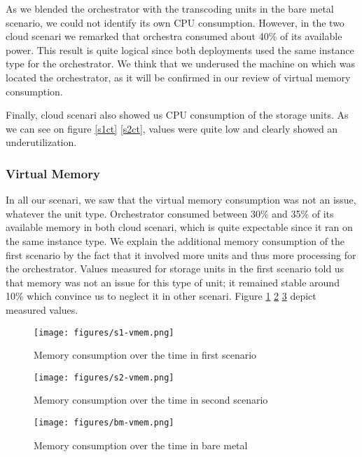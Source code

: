 \documentclass[a4paper, titlepage]{paper}
\numberwithin{figure}{section}
\numberwithin{table}{section}
\begin{document}
        As we blended the orchestrator with the transcoding units in the bare metal scenario, we could not identify its own CPU consumption. However, in the two cloud scenari we remarked that orchestra consumed about 40\% of its available power. This result is quite logical since both deployments used the same instance type for the orchestrator. We think that we underused the machine on which was located the orchestrator, as it will be confirmed in our review of virtual memory consumption.

        Finally, cloud scenari also showed us CPU consumption of the storage units. As we can see on figure \ref{s1ct} \ref{s2ct}, values were quite low and clearly showed an underutilization.

      \subsubsection{Virtual Memory}
        In all our scenari, we saw that the virtual memory consumption was not an issue, whatever the unit type. Orchestrator consumed between 30\% and 35\% of its available memory in both cloud scenari, which is quite expectable since it ran on the same instance type. We explain the additional memory consumption of the first scenario by the fact that it involved more units and thus more processing for the orchestrator. Values measured for storage units in the first scenario told us that memory was not an issue for this type of unit; it remained stable around 10\% which convince us to neglect it in other scenari. Figure \ref{s1v} \ref{s2v} \ref{bmv} depict measured values.
        
        \begin{figure}
          \centering
          \texttt{[image: figures/s1-vmem.png]}
          \caption{Memory consumption over the time in first scenario}
          \label{s1v}
        \end{figure}
        \begin{figure}
          \centering
          \texttt{[image: figures/s2-vmem.png]}
          \caption{Memory consumption over the time in second scenario}
          \label{s2v}
        \end{figure}
        \begin{figure}
          \centering
          \texttt{[image: figures/bm-vmem.png]}
          \caption{Memory consumption over the time in bare metal}
          \label{bmv}
        \end{figure}
\end{document}

